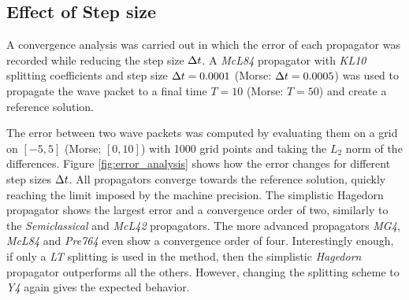 \subsection{Effect of Step size}
\label{subsec:convergence}
%
A convergence analysis was carried out in which the error of each propagator was recorded while reducing the step size $\Delta t$.
A \emph{McL84} propagator with \emph{KL10} splitting coefficients and step size $\Delta t = 0.0001$ (Morse: $\Delta t = 0.0005$) was used to propagate the wave packet to a final time $T = 10$ (Morse: $T=50$) and create a reference solution.
\par\medskip
%
The error between two wave packets was computed by evaluating them on a grid on $[-5,5]$ (Morse: $[0,10]$) with 1000 grid points and taking the $L_2$ norm of the differences.
Figure \ref{fig:error_analysis} shows how the error changes for different step sizes $\Delta t$.
All propagators converge towards the reference solution, quickly reaching the limit imposed by the machine precision.
The simplistic Hagedorn propagator shows the largest error and a convergence order of two, similarly to the \emph{Semiclassical} and \emph{McL42} propagators.
The more advanced propagators \emph{MG4}, \emph{McL84} and \emph{Pre764} even show a convergence order of four.
Interestingly enough, if only a \emph{LT} splitting is used in the  method, then the simplistic \emph{Hagedorn} propagator outperforms all the others. However, changing the splitting scheme to \emph{Y4} again gives the expected behavior.
%
